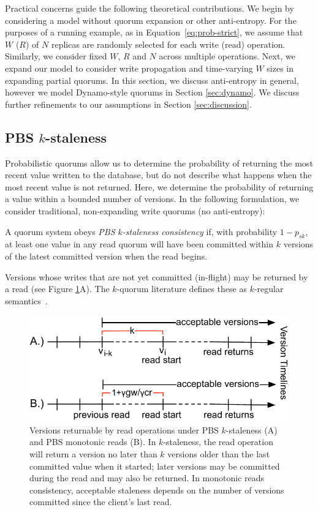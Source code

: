 \documentclass{vldb}
\newcommand{\subsectionskip}{-0em}
\begin{document}
Practical concerns guide the following theoretical contributions.  We
begin by considering a model without quorum expansion or other anti-entropy.
For the purposes of a running example, as in
Equation~\ref{eq:prob-strict}, we assume that $W$ ($R$) of $N$
replicas are randomly selected for each write (read) operation.
Similarly, we consider fixed $W$, $R$ and $N$ across multiple
operations. Next, we expand our model to consider write propagation
and time-varying $W$ sizes in expanding partial quorums.  In this
section, we discuss anti-entropy in general, however we model
Dynamo-style quorums in Section \ref{sec:dynamo}. We discuss further
refinements to our assumptions in Section \ref{sec:discussion}.

\vspace{\subsectionskip}\subsection{PBS $k$-staleness}
\label{sec:kstale}

Probabilistic quorums allow us to determine the probability of
returning the most recent value written to the database, but do not
describe what happens when the most recent value is not returned.
Here, we determine the probability of returning a value within a
bounded number of versions.  In the following formulation, we consider
traditional, non-expanding write quorums (no anti-entropy):
\begin{definition}
A quorum system obeys \textit{PBS $k$-staleness consistency} if, with
probability $1-p_{sk}$, at least one value in any read quorum will
have been committed within $k$ versions of the latest committed
version when the read begins.
\end{definition}
Versions whose writes that are not yet committed (in-flight) may be
returned by a read (see Figure \ref{fig:timelines}A).  The $k$-quorum
literature defines these as $k$-regular semantics~\cite{non-strict}.

\begin{figure}
\centering
\includegraphics[width=.95\columnwidth]{figs/timelines.pdf}
\vspace{-8pt}
\caption{Versions returnable by read operations under PBS
  $k$-staleness (A) and PBS monotonic reads (B). In $k$-staleness, the
  read operation will return a version no later than $k$ versions
  older than the last committed value when it started; later versions
  may be committed during the read and may also be returned.  In
  monotonic reads consistency, acceptable staleness depends on the
  number of versions committed since the client's last read.}
\vspace{-12pt}
\label{fig:timelines}
\end{figure}
\end{document}
